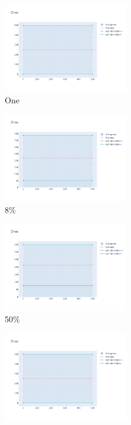 \documentclass[12pt, fleqn]{report}                             %
\theoremstyle{break}                                            %
\begin{document}
      \begin{figure}[ht!]
        \centering
        \begin{subfigure}[b]{0.4\linewidth}
          \includegraphics[width=0.6\textwidth]{Images/1/dia-a.png}
          \caption{One}
        \end{subfigure}
        \begin{subfigure}[b]{0.4\linewidth}
          \includegraphics[width=0.6\textwidth]{Images/1/dia-b.png}
          \caption{8\%}
        \end{subfigure}
        \begin{subfigure}[b]{0.4\linewidth}
          \includegraphics[width=0.6\textwidth]{Images/1/dia-c.png}
          \caption{50\%}
        \end{subfigure}
        \begin{subfigure}[b]{0.4\linewidth}
          \includegraphics[width=0.6\textwidth]{Images/1/dia-d.png}

\end{subfigure}
\end{figure}
\end{document}
